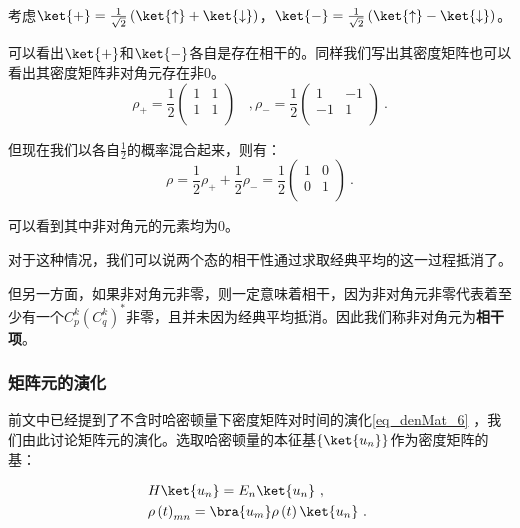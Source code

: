 \begin{example}{}
考虑$\ket{+} = \frac{1}{\sqrt{2}}\left(\ket{\uparrow} + \ket{\downarrow}\right)$，$\ket{-} = \frac{1}{\sqrt{2}}\left(\ket{\uparrow} - \ket{\downarrow}\right)$。

可以看出$\ket{+}$和$\ket{-}$各自是存在相干的。同样我们写出其密度矩阵也可以看出其密度矩阵非对角元存在非$0$。
\begin{equation}
\rho_+ =  \frac{1}{2}\begin{pmatrix}
1&1 \\
1&1 \\
\end{pmatrix}~~~~,
\rho_- =  \frac{1}{2}\begin{pmatrix}
1&-1 \\
-1&1 \\
\end{pmatrix}~.
\end{equation}

但现在我们以各自$\frac{1}{2}$的概率混合起来，则有：
$$\rho = \frac{1}{2}\rho_+ + \frac{1}{2}\rho_- = \frac{1}{2}\begin{pmatrix}
1&0 \\
0&1 \\
\end{pmatrix}~.$$

可以看到其中非对角元的元素均为$0$。
\end{example}

对于这种情况，我们可以说两个态的相干性通过求取经典平均的这一过程抵消了。

但另一方面，如果非对角元非零，则一定意味着相干，因为非对角元非零代表着至少有一个$C_p^k\left(C_q^k\right)^*$非零，且并未因为经典平均抵消。因此我们称非对角元为\textbf{相干项}。

\subsubsection{矩阵元的演化}

前文中已经提到了不含时哈密顿量下密度矩阵对时间的演化\autoref{eq_denMat_6} ，我们由此讨论矩阵元的演化。选取哈密顿量的本征基$\left\{\ket{u_n}\right\}$作为密度矩阵的基：

\begin{equation}
\begin{aligned}
&H \ket{u_n} = E_n \ket{u_n}~, \\ 
&\rho\left( t \right)_{mn} = \bra{u_m} \rho\left( t \right) \ket{u_n}~.
\end{aligned}~
\end{equation}

